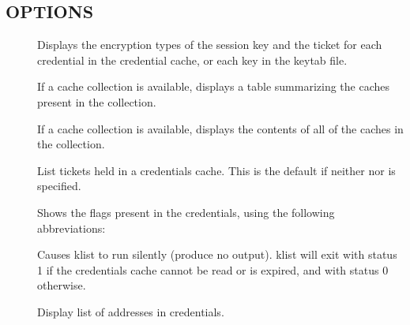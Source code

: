 \documentclass[letterpaper,10pt,english]{sphinxmanual}
\begin{document}
\subsection{OPTIONS}
\label{\detokenize{user/user_commands/klist:options}}\begin{description}
\item[{}] \leavevmode
Displays the encryption types of the session key and the ticket
for each credential in the credential cache, or each key in the
keytab file.

\item[{}] \leavevmode
If a cache collection is available, displays a table summarizing
the caches present in the collection.

\item[{}] \leavevmode
If a cache collection is available, displays the contents of all
of the caches in the collection.

\item[{}] \leavevmode
List tickets held in a credentials cache. This is the default if
neither  nor  is specified.

\item[{}] \leavevmode
Shows the flags present in the credentials, using the following
abbreviations:

%
\begin{sphinxVerbatim}[commandchars=\\\{\}]
    
    
    
    
    
    
    
    
    
     
    
      
      
    
\end{sphinxVerbatim}

\item[{}] \leavevmode
Causes klist to run silently (produce no output).  klist will exit
with status 1 if the credentials cache cannot be read or is
expired, and with status 0 otherwise.

\item[{}] \leavevmode
Display list of addresses in credentials.


\end{description}
\end{document}
